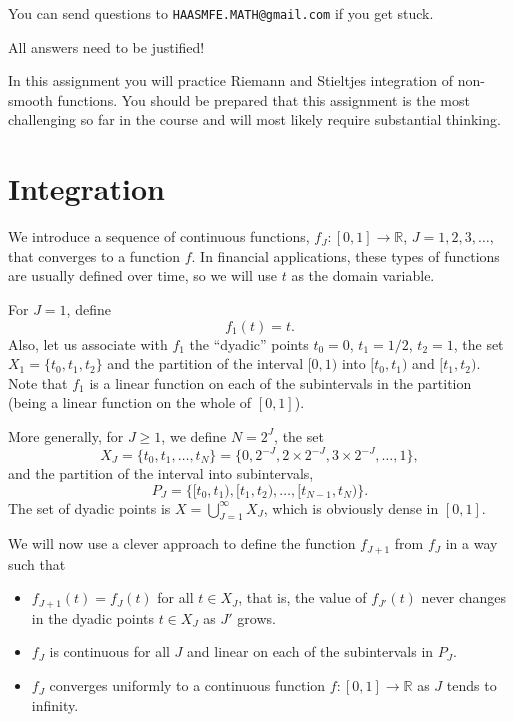 \documentclass{article}
\begin{document}
\noindent You can send questions to \texttt{HAASMFE.MATH@gmail.com} if you get stuck.

\vspace{1em}

\noindent All answers need to be justified!

\newpage

In this assignment you will practice Riemann and Stieltjes integration of non-smooth functions.
You should be prepared that this assignment is the most challenging so far in the course and will
most likely require substantial thinking.

\section{Integration}

We introduce a sequence of continuous functions, $f_J : [0,1]\to \mathbb{R}$, $J=1,2,3,\ldots$, that converges to a function $f$.
In financial applications, these types of functions are usually defined over time, so we will use $t$ as the domain variable.

For $J=1$, define
\[
f_1(t)=t.
\]
Also, let us associate with $f_1$ the ``dyadic'' points $t_0=0$, $t_1=1/2$, $t_2=1$, the set $X_1=\{t_0,t_1,t_2\}$ and the partition of the interval $[0,1)$ into $[t_0,t_1)$ and $[t_1,t_2)$.
Note that $f_1$ is a linear function on each of the subintervals in the partition (being a linear function on the whole of $[0,1]$).

More generally, for $J\ge 1$, we define $N=2^J$, the set
\[
X_J=\{t_0,t_1,\ldots,t_N\}=\{0,2^{-J},2\times 2^{-J},3\times 2^{-J},\ldots,1\},
\]
and the partition of the interval into subintervals,
\[
P_J=\{[t_0,t_1),[t_1,t_2),\ldots,[t_{N-1},t_N)\}.
\]
The set of dyadic points is $X=\bigcup_{J=1}^\infty X_J$, which is obviously dense in $[0,1]$.

We will now use a clever approach to define the function $f_{J+1}$ from $f_J$ in a way such that
\begin{itemize}
\item $f_{J+1}(t)=f_J(t)$ for all $t\in X_J$, that is, the value of $f_{J'}(t)$ never changes in the dyadic points $t\in X_J$ as $J'$ grows.
\item $f_J$ is continuous for all $J$ and linear on each of the subintervals in $P_J$.
\item $f_J$ converges uniformly to a continuous function $f:[0,1]\to \mathbb{R}$ as $J$ tends to infinity.
\end{itemize}
\end{document}
